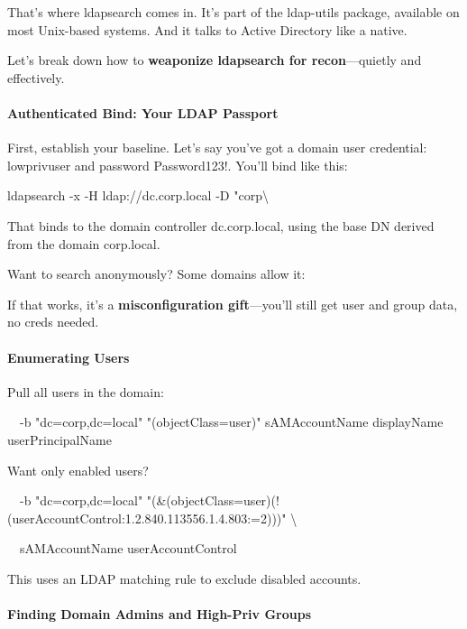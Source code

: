 That’s where ldapsearch comes in. It’s part of the ldap-utils package, available on most Unix-based systems. And it talks to Active Directory like a native.

Let’s break down how to \textbf{weaponize ldapsearch for recon}—quietly and effectively.

\paragraph{\textbf{   Authenticated Bind: Your LDAP Passport}}

First, establish your baseline. Let’s say you’ve got a domain user credential: lowprivuser and password Password123!. You’ll bind like this:


ldapsearch -x -H ldap://dc.corp.local -D "corp\textbackslash{}%

That binds to the domain controller dc.corp.local, using the base DN derived from the domain corp.local.

Want to search anonymously? Some domains allow it:


If that works, it’s a \textbf{misconfiguration gift}—you’ll still get user and group data, no creds needed.

\paragraph{\textbf{Enumerating Users}}

Pull all users in the domain:


  -b "dc=corp,dc=local" "(objectClass=user)" sAMAccountName displayName userPrincipalName

Want only enabled users?


  -b "dc=corp,dc=local" "(\&(objectClass=user)(!(userAccountControl:1.2.840.113556.1.4.803:=2)))" \textbackslash{}

  sAMAccountName userAccountControl

This uses an LDAP matching rule to exclude disabled accounts.

\paragraph{\textbf{   Finding Domain Admins and High-Priv Groups}}


